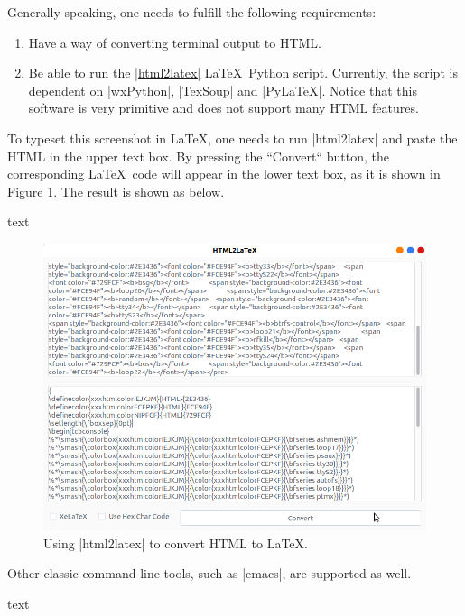 \documentclass[letterpaper, 11pt, DIV=11]{scrartcl}
\begin{document}
Generally speaking, one needs to fulfill the following requirements:
\begin{enumerate}
\item Have a way of converting terminal output to HTML.
\item Be able to run the \href{https://github.com/xziyue/latex-beautiful-listings-screenshot/blob/master/html2tex_gui.py}{\rawinline|html2latex|} \LaTeX\ Python script. Currently, the script is dependent on \href{https://pypi.org/project/wxPython/}{\rawinline|wxPython|}, \href{https://pypi.org/project/TexSoup/}{\rawinline|TexSoup|} and \href{https://pypi.org/project/PyLaTeX/}{\rawinline|PyLaTeX|}. Notice that this software is very primitive and does not support many HTML features.
\end{enumerate}

To typeset this screenshot in \LaTeX, one needs to run \rawinline|html2latex| and paste the HTML in the upper text box. By pressing the ``Convert`` button, the corresponding \LaTeX\ code will appear in the lower text box, as it is shown in Figure \ref{fig:python-html2latex}. The result is shown as below.

\begin{tcbsrccode}{text}

\end{tcbsrccode}


\begin{figure}[htpb]
\centering
\includegraphics[width=0.7\linewidth]{html2latex}
\caption{Using \rawinline|html2latex| to convert HTML to \LaTeX.}
\label{fig:python-html2latex}
\end{figure} 

Other classic command-line tools, such as \rawinline|emacs|, are supported as well.

\begin{tcbsrccode}{text}

\end{tcbsrccode}

\end{document}
